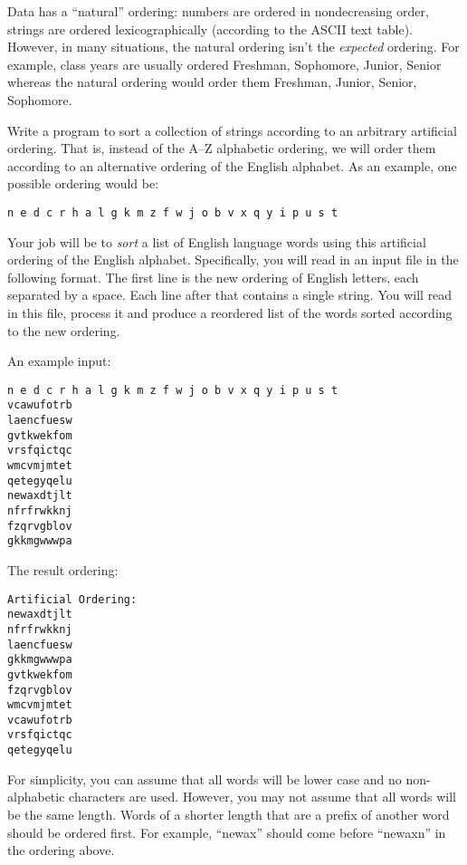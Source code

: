 \begin{exer}
Data has a ``natural'' ordering: numbers are ordered in nondecreasing 
order, strings are ordered lexicographically (according to the ASCII text 
table).  However, in many situations, the natural ordering isn't the 
\emph{expected} ordering.  For example, class years are usually ordered Freshman, Sophomore, Junior, Senior whereas the natural ordering 
would order them Freshman, Junior, Senior, Sophomore.  

Write a program to sort a collection of strings according to 
an arbitrary artificial ordering.  That is, instead of the A--Z 
alphabetic ordering, we will order them according to an alternative 
ordering of the English alphabet.  As an example, one possible
ordering would be:

\texttt{n e d c r h a l g k m z f w j o b v x q y i p u s t}

Your job will be to \emph{sort} a list of English language words 
using this artificial ordering of the English alphabet.  Specifically, 
you will read in an input file in the following format.  The first line 
is the new ordering of English letters, each separated by a space.  
Each line after that contains a single string.  
You will read in this file, process it and produce a reordered list 
of the words sorted according to the new ordering.  

An example input:

\begin{verbatim}
n e d c r h a l g k m z f w j o b v x q y i p u s t
vcawufotrb
laencfuesw
gvtkwekfom
vrsfqictqc
wmcvmjmtet
qetegyqelu
newaxdtjlt
nfrfrwkknj
fzqrvgblov
gkkmgwwwpa
\end{verbatim}

The result ordering: 

\begin{verbatim}
Artificial Ordering: 
newaxdtjlt
nfrfrwkknj
laencfuesw
gkkmgwwwpa
gvtkwekfom
fzqrvgblov
wmcvmjmtet
vcawufotrb
vrsfqictqc
qetegyqelu
\end{verbatim}

For simplicity, you can assume that all words will be lower 
case and no non-alphabetic characters are used.  However, 
you may not assume that all words will be the same length. 
Words of a shorter length that are a prefix of another word 
should be ordered first.  For example, ``newax'' should come 
before ``newaxn'' in the ordering above.
\end{exer}
